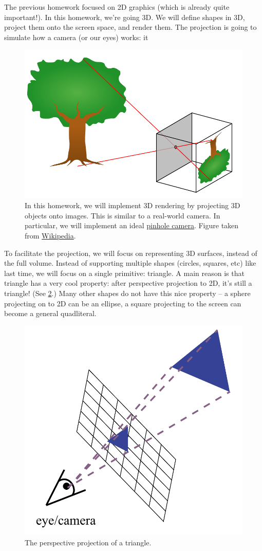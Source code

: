 




The previous homework focused on 2D graphics (which is already quite important!). In this homework, we're going 3D. We will define shapes in 3D, project them onto the screen space, and render them. The projection is going to simulate how a camera (or our eyes) works: it 

\begin{figure}[h]
    \centering
    \includegraphics[width=0.5\linewidth]{imgs/pinhole.pdf}
    \caption{In this homework, we will implement 3D rendering by projecting 3D objects onto images. This is similar to a real-world camera. In particular, we will implement an ideal \href{https://en.wikipedia.org/wiki/Pinhole_camera}{pinhole camera}. Figure taken from \href{https://commons.wikimedia.org/wiki/File:Pinhole-camera.svg}{Wikipedia}.}
    \label{fig:pinhole}
\end{figure}

To facilitate the projection, we will focus on representing 3D surfaces, instead of the full volume. Instead of supporting multiple shapes (circles, squares, etc) like last time, we will focus on a single primitive: triangle. A main reason is that triangle has a very cool property: after perspective projection to 2D, it's still a triangle! (See \cref{fig:perspective}.) Many other shapes do not have this nice property -- a sphere projecting on to 2D can be an ellipse, a square projecting to the screen can become a general quadliteral.

\begin{figure}[h]
    \centering
    \includegraphics[width=0.5\linewidth]{imgs/perspective_projection.pdf}
    \caption{The perspective projection of a triangle.}
    \label{fig:perspective}
\end{figure}

